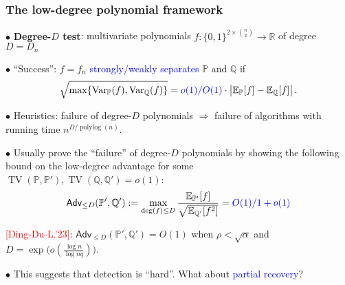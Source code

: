 \documentclass{beamer}
\theoremstyle{plain}
\theoremstyle{definition}
\newcommand{\Pb}{\mathbb P}
\newcommand{\Qb}{\mathbb Q}
\newcommand{\red}{\textcolor{red}}
\newcommand{\blue}{\textcolor{blue}}
\begin{document}
\begin{frame}
\frametitle{The low-degree polynomial framework}

\small

\pause $\bullet$ {\bf Degree-$D$ test}: multivariate polynomials $f: \{ 0,1 \}^{2\times \binom{n}{2}} \longrightarrow \mathbb R$ of degree $D=D_n$

\medskip

\pause $\bullet$ ``Success'': $f=f_n$ \blue{strongly/weakly separates} $\Pb$ and $\Qb$ if
\begin{equation*}
    \sqrt{ \max\{ \operatorname{Var}_{\Pb}(f), \operatorname{Var}_{\Qb}(f) \} } = \blue{o(1)/O(1)} \cdot \big| \mathbb E_{\Pb}[f] - \mathbb E_{\Qb}[f] \big| \,. 
\end{equation*}

\pause $\bullet$ Heuristics: failure of degree-$D$ polynomials $\Longrightarrow$ failure of algorithms with running time $n^{D/\operatorname{polylog}(n)}$.

\medskip

\pause $\bullet$ Usually prove the ``failure'' of degree-$D$ polynomials by showing the following bound on the low-degree advantage for some $\operatorname{TV}(\Pb,\Pb'),\operatorname{TV}(\Qb,\Qb')=o(1)$:
\begin{align*}
    \mathsf{Adv}_{\leq D}(\Pb',\Qb'):= \max_{ \operatorname{deg}(f) \leq D } \frac{ \mathbb E_{\Pb'}[f] }{ \sqrt{\mathbb E_{\Qb'}[f^2]} } = \blue{O(1)/1+o(1)}
\end{align*}

\pause \red{[Ding-Du-L.'23]}: $\mathsf{Adv}_{\leq D}(\Pb',\Qb')=O(1)$ when $\rho<\sqrt{\alpha}$ and $D=\exp\big( o(\tfrac{\log n}{\log nq}) \big)$.

\medskip

\pause $\bullet$ This suggests that detection is ``hard''. What about \blue{partial recovery}?

\end{frame}
\end{document}
